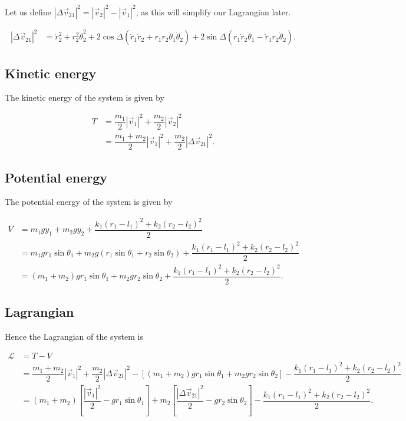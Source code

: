 \documentclass[12pt,a4paper,portrait]{article}
\newcommand{\lag}{\mathcal{L}}
\begin{document}
\begin{landscape}
Let us define $|\Delta \vec{v}_{21}|^2 = |\vec{v}_2|^2 - |\vec{v}_1|^2$, as this will simplify our Lagrangian later.

\begin{align*}
	|\Delta \vec{v}_{21}|^2 &= \dot{r}_2^2 + r_2^2\dot{\theta}_2^2 + 2\cos{\Delta}(\dot{r}_1\dot{r}_2 + r_1r_2\dot{\theta}_1\dot{\theta}_2) + 2\sin{\Delta}(r_1\dot{r}_2\dot{\theta}_1-\dot{r}_1r_2\dot{\theta}_2).
\end{align*}

\subsection{Kinetic energy}
The kinetic energy of the system is given by

\begin{align*}
	T &= \dfrac{m_1}{2}|\vec{v}_1|^2 + \dfrac{m_2}{2}|\vec{v}_2|^2 \\
	&= \dfrac{m_1+m_2}{2}|\vec{v}_1|^2 + \dfrac{m_2}{2}|\Delta \vec{v}_{21}|^2.
\end{align*}

\subsection{Potential energy}
The potential energy of the system is given by

\begin{align*}
	V &= m_1 gy_1 + m_2gy_2 + \dfrac{k_1(r_1-l_1)^2+k_2(r_2-l_2)^2}{2}\\
	&= m_1 gr_1\sin{\theta_1} + m_2g(r_1\sin{\theta_1} + r_2\sin{\theta_2}) + \dfrac{k_1(r_1-l_1)^2+k_2(r_2-l_2)^2}{2}\\
	&= (m_1+m_2)gr_1\sin{\theta_1} + m_2gr_2\sin{\theta_2} + \dfrac{k_1(r_1-l_1)^2+k_2(r_2-l_2)^2}{2}.
\end{align*}

\subsection{Lagrangian}
Hence the Lagrangian of the system is

\begin{align*}
	\lag &= T - V \\
	&= \dfrac{m_1+m_2}{2}|\vec{v}_1|^2 + \dfrac{m_2}{2}|\Delta \vec{v}_{21}|^2 - \left[(m_1+m_2)gr_1\sin{\theta_1} + m_2gr_2\sin{\theta_2}\right] - \dfrac{k_1(r_1-l_1)^2+k_2(r_2-l_2)^2}{2} \\
	&= (m_1+m_2)\left[\dfrac{|\vec{v}_1|^2}{2} - gr_1\sin{\theta_1}\right] + m_2\left[\dfrac{|\Delta \vec{v}_{21}|^2}{2} - gr_2\sin{\theta_2}\right]  - \dfrac{k_1(r_1-l_1)^2+k_2(r_2-l_2)^2}{2}.
\end{align*}


\end{landscape}
\end{document}
